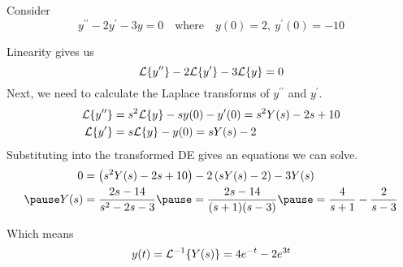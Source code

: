 \documentclass{beamer}
\begin{document}
\begin{frame}
\begin{example}
Consider
\begin{equation*}
y^{\prime\prime}-2y^\prime-3y=0
\quad\text{where}\quad
y(0)=2,~y^\prime(0)=-10
\end{equation*}\pause

\vspace{-7mm}
Linearity gives us
\begin{equation*}
\mathcal{L}\{y^{\prime\prime}\}-2\mathcal{L}\{y^\prime\}-3\mathcal{L}\{y\}=0
\end{equation*}\pause
Next, we need to calculate the Laplace transforms of $y^{\prime\prime}$ and $y^\prime$.
\begin{equation*}
\begin{aligned}
\mathcal{L}\{y^{\prime\prime}\}&=s^2 \mathcal{L}\{y\}-s y(0)-y^\prime(0)=s^2 Y(s) -2s +10\\
\mathcal{L}\{y^\prime\}&=s\mathcal{L}\{y\}-y(0)=s Y(s)-2
\end{aligned}
\end{equation*}\pause
Substituting into the transformed DE gives an equations we can solve.
\begin{equation*}
\begin{aligned}
0&=\left(s^2 Y(s) -2s +10\right) -2\left(s Y(s)-2\right)-3Y(s)\\\pause
Y(s)&=\dfrac{2s-14}{s^2-2s-3}\pause
=\dfrac{2s-14}{(s+1)(s-3)}\pause
=\dfrac{4}{s+1}-\dfrac{2}{s-3}
\end{aligned}
\end{equation*}\pause

\vspace{-5.5mm}
Which means
\begin{equation*}
y(t)=\mathcal{L}^{-1}\{Y(s)\}= 4e^{-t}-2e^{3t}
\end{equation*}
\end{example}
\end{frame}
\end{document}
